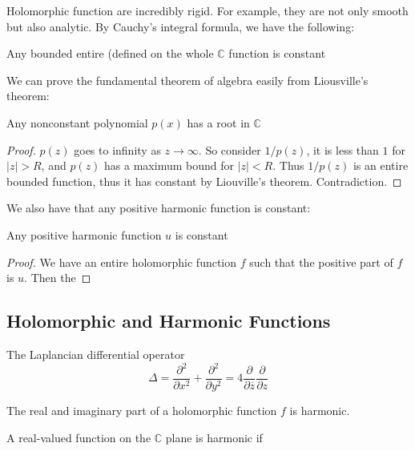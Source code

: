 \documentclass[main.tex]{subfiles}
\begin{document}
Holomorphic function are incredibly rigid. For example, they are not only smooth but also analytic. By Cauchy's integral formula, we have the following:

\begin{theorem}
Any bounded entire (defined on the whole $\mathbb{C}$ function is constant
\end{theorem}

We can prove the fundamental theorem of algebra easily from Liousville's theorem:

\begin{corollary}
Any nonconstant polynomial $p(x)$ has a root in $\mathbb{C}$
\end{corollary}
\begin{proof}
$p(z)$ goes to infinity as $z \rightarrow \infty$. So consider $1/p(z)$, it is less than $1$ for $|z| > R$, and $p(z)$ has a  maximum bound for $|z| < R$. Thus $1/p(z)$ is an entire bounded function, thus it has constant by Liouville's theorem. Contradiction.
\end{proof}

We also have that any positive harmonic function is constant:

\begin{corollary}
Any positive harmonic function $u$ is constant
\end{corollary}

\begin{proof}
We have an entire holomorphic function $f$ such that the positive part of $f$ is $u$. Then the 
\end{proof}
\subsection{Holomorphic and Harmonic Functions}

The Laplancian differential operator 
$$
\Delta = \frac{\partial^2}{\partial x^2} + \frac{\partial^2}{\partial y^2} = 4 \frac{\partial}{\partial \overline{z}} \frac{\partial}{\partial {z}}
$$

The real and imaginary part of a holomorphic function $f$ is harmonic.

A real-valued function on the $\mathbb{C}$ plane is harmonic if 
\end{document}
